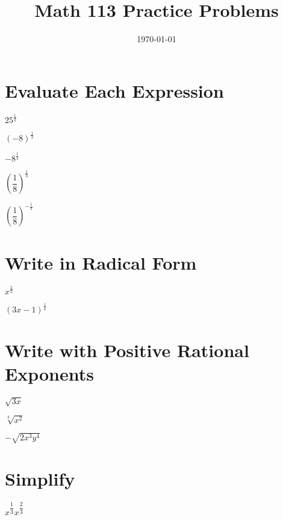 \documentclass[fleqn,addpoints]{exam}
\title{Math 113 Practice Problems}
\author{}
\date{\today}
\begin{document}
\maketitle

\begin{questions}

\section{Evaluate Each Expression}

\question \( 25^{\frac{1}{2}}\) 
\vspace{0.5 cm}

\question \( (-8)^{\frac{1}{3}}\) 
\vspace{0.5 cm}

\question \( -8^{\frac{1}{3}}\) 
\vspace{0.5 cm}

\question \( \left( \dfrac{1}{8} \right)^{\frac{1}{3}}\) 
\vspace{0.5 cm}

\question \( \left( \dfrac{1}{8} \right)^{- \frac{1}{3}}\) 
\vspace{0.5 cm}

\section{Write in Radical Form}
\question \( x^{\frac{2}{3}} \) 
\vspace{0.5 cm}

\question \( (3x - 1)^{\frac{1}{2}} \) 
\vspace{0.5 cm}

\section{Write with Positive Rational Exponents}
\question \( \sqrt{3x} \) 
\vspace{0.5 cm}

\question \( \sqrt[3]{x^2} \) 
\vspace{0.5 cm}

\question \( -\sqrt{2x^3y^4}\) 
\vspace{0.5 cm}

\section{Simplify}
\question \( x^{\dfrac{1}{3}}x^{\dfrac{2}{3}} \) 
\vspace{0.5 cm}


\end{questions}
\end{document}
